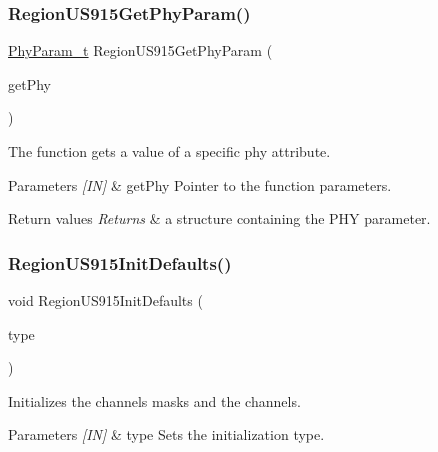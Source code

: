 \subsubsection{\texorpdfstring{Region\+U\+S915\+Get\+Phy\+Param()}{RegionUS915GetPhyParam()}}
{\footnotesize\ttfamily \hyperlink{group__REGION_gaed159b26e5c4677236b6e8677019db30}{Phy\+Param\+\_\+t} Region\+U\+S915\+Get\+Phy\+Param (\begin{DoxyParamCaption}\item[{\hyperlink{group__REGION_gab471483fff904f4f89bbc03f7fc380ab}{Get\+Phy\+Params\+\_\+t} $\ast$}]{get\+Phy }\end{DoxyParamCaption})}



The function gets a value of a specific phy attribute. 


\begin{DoxyParams}{Parameters}
{\em \mbox{[}\+I\+N\mbox{]}} & get\+Phy Pointer to the function parameters.\\
\hline
\end{DoxyParams}

\begin{DoxyRetVals}{Return values}
{\em Returns} & a structure containing the P\+HY parameter. \\
\hline
\end{DoxyRetVals}
\mbox{\label{group__REGIONUS915_ga099942705729797728a84270350aac78}} 
\subsubsection{\texorpdfstring{Region\+U\+S915\+Init\+Defaults()}{RegionUS915InitDefaults()}}
{\footnotesize\ttfamily void Region\+U\+S915\+Init\+Defaults (\begin{DoxyParamCaption}\item[{\hyperlink{group__REGION_gaddc73ae10673ec925724e7870363bda9}{Init\+Type\+\_\+t}}]{type }\end{DoxyParamCaption})}



Initializes the channels masks and the channels. 


\begin{DoxyParams}{Parameters}
{\em \mbox{[}\+I\+N\mbox{]}} & type Sets the initialization type. \\
\hline
\end{DoxyParams}
\mbox{\label{group__REGIONUS915_gab4977ffc251303aaae4efec0eed63c23}} 
